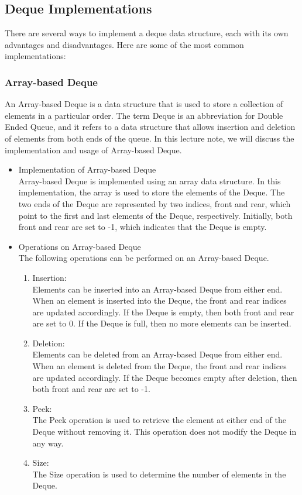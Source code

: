 \documentclass[a4paper, 11pt, oneside]{book} %
\begin{document}
\subsection{Deque Implementations}
There are several ways to implement a deque data structure, each with its own advantages and disadvantages. Here are some of the most common implementations:

\subsubsection{Array-based Deque}
An Array-based Deque is a data structure that is used to store a collection of elements in a particular order. The term Deque is an abbreviation for Double Ended Queue, and it refers to a data structure that allows insertion and deletion of elements from both ends of the queue. In this lecture note, we will discuss the implementation and usage of Array-based Deque.

\begin{itemize}
    \item Implementation of Array-based Deque
    \\
    Array-based Deque is implemented using an array data structure. In this implementation, the array is used to store the elements of the Deque. The two ends of the Deque are represented by two indices, front and rear, which point to the first and last elements of the Deque, respectively. Initially, both front and rear are set to -1, which indicates that the Deque is empty.

    \item Operations on Array-based Deque
    \\
    The following operations can be performed on an Array-based Deque.
    \begin{enumerate}
        \item Insertion:
        \\
        Elements can be inserted into an Array-based Deque from either end. When an element is inserted into the Deque, the front and rear indices are updated accordingly. If the Deque is empty, then both front and rear are set to 0. If the Deque is full, then no more elements can be inserted.
        \item Deletion:
        \\
        Elements can be deleted from an Array-based Deque from either end. When an element is deleted from the Deque, the front and rear indices are updated accordingly. If the Deque becomes empty after deletion, then both front and rear are set to -1.
        \item  Peek:
        \\
        The Peek operation is used to retrieve the element at either end of the Deque without removing it. This operation does not modify the Deque in any way.
        
        \item Size:
        \\
        The Size operation is used to determine the number of elements in the Deque. 
    \end{enumerate}
\end{itemize}
\end{document}
